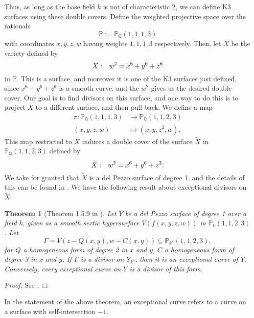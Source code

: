 \documentclass[12pt,twoside]{reedthesis}
\theoremstyle{plain}
\newtheorem{theorem}{Theorem}[chapter]
\theoremstyle{definition}
\theoremstyle{remark}
\newcommand{\QQ}{\mathbb{Q}}
\newcommand{\Proj}{\mathbb{P}}
\begin{document}
Thus, as long as the base field $k$ is not of characteristic 2, we can define K3 surfaces using these double covers. Define the weighted projective space over the rationals
\[
\Proj:=\Proj_\QQ(1,1,1,3)
\]
with coordinates $x,y,z,w$ having weights $1,1,1,3$ respectively. Then, let $X$ be the variety defined by 
\[
X:\hspace{0.25cm} w^2=x^6+y^6+z^6
\]
in $\Proj$. This is a surface, and moreover it is one of the K3 surfaces just defined, since $x^6+y^6+z^6$ is a smooth curve, and the $w^2$ gives us the desired double cover. Our goal is to find divisors on this surface, and one way to do this is to project $X$ to a different surface, and then pull back. We define a map
\begin{align*}
\pi:\Proj_\QQ(1,1,1,3)&\to\Proj_\QQ(1,1,2,3)\\
(x,y,z,w)&\mapsto(x,y,z^2,w).
\end{align*}
This map restricted to $X$ induces a double cover of the surface $\widetilde{X}$ in $\Proj_\QQ(1,1,2,3)$ defined by
\[
\widetilde{X}:\hspace{0.25cm} w^2=x^6+y^6+z^3.
\]
We take for granted that $\widetilde{X}$ is a del Pezzo surface of degree 1, and the details of this can be found in \cite{tonyThesis}. We have the following result about exceptional divisors on $\widetilde{X}$.
\begin{theorem}[Theorem 1.5.9 in \cite{tonyThesis}]
Let $Y$ be a del Pezzo surface of degree 1 over a field $k$, given as a smooth sextic hypersurface $V(f(x,y,z,w))$ in $\Proj_k(1,1,2,3)$. Let
\[
\Gamma=V(z-Q(x,y),w-C(x,y))\subseteq\Proj_{k^s}(1,1,2,3),
\]
for $Q$ a homogeneous form of degree 2 in $x$ and $y$, $C$ a homogeneous form of degree 3 in $x$ and $y$. If $\Gamma$ is a divisor on $Y_{k^s}$, then it is an exceptional curve of $Y$. Conversely, every exceptional curve on $Y$ is a divisor of this form.
\end{theorem}
\begin{proof}
See \cite[Section 4.1.3]{tonyThesis}.
\end{proof}
\noindent In the statement of the above theorem, an exceptional curve refers to a curve on a surface with self-intersection $-1$.
\end{document}
